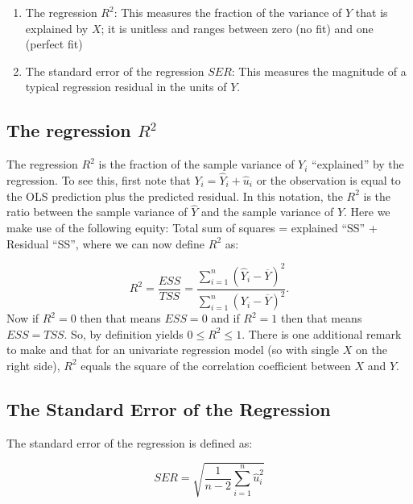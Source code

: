 \documentclass[
]{book}
\providecommand{\tightlist}{%
  \setlength{\itemsep}{0pt}\setlength{\parskip}{0pt}}
\begin{document}
\begin{enumerate}
\def\labelenumi{\arabic{enumi}.}
\tightlist
\item
  The regression \textbf{\(R^2\)}: This measures the fraction of the variance of \(Y\) that is explained by \(X\); it is unitless and ranges between zero (no fit) and one (perfect fit)
\item
  The standard error of the regression \textbf{\(SER\)}: This measures the magnitude of a typical regression residual in the units of \(Y\).
\end{enumerate}

\hypertarget{the-regression-r2}{%
\subsection{\texorpdfstring{The regression \(R^2\)}{The regression R\^{}2}}\label{the-regression-r2}}

The regression \(R^2\) is the fraction of the sample variance of \(Y_i\) ``explained'' by the
regression. To see this, first note that \(Y_i = \hat{Y}_i + \hat{u}_i\) or the observation is equal to the OLS prediction plus the predicted residual. In this notation, the \(R^2\) is the ratio between the sample variance of \(\hat{Y}\) and the sample variance of \(Y\). Here we make use of the following equity: Total sum of squares = explained ``SS'' + Residual ``SS'', where we can now define \(R^2\) as:

\begin{equation}
R^2= \frac{ESS}{TSS} = \frac{\sum^n_{i=1}\left(\hat{Y}_i - \overline{Y}\right)^2}{\sum^n_{i=1}\left(Y_i - \overline{Y}\right)^2}.
    \label{eq:r2}
\end{equation}
Now if \(R^2 = 0\) then that means \(ESS = 0\) and if \(R^2 = 1\) then that means \(ESS = TSS\). So, by definition yields \(0 \leq R^2 \leq 1\). There is one additional remark to make and that for an univariate regression model (so with single \(X\) on the right side), \(R^2\) equals the square of the correlation coefficient between \(X\) and \(Y\).

\hypertarget{the-standard-error-of-the-regression}{%
\subsection{The Standard Error of the Regression}\label{the-standard-error-of-the-regression}}

The standard error of the regression is defined as:

\begin{equation}
SER = \sqrt{\frac{1}{n-2} \sum_{i=1}^n \hat{u}_i^2}
\label{eq:ser}
\end{equation}
\end{document}
